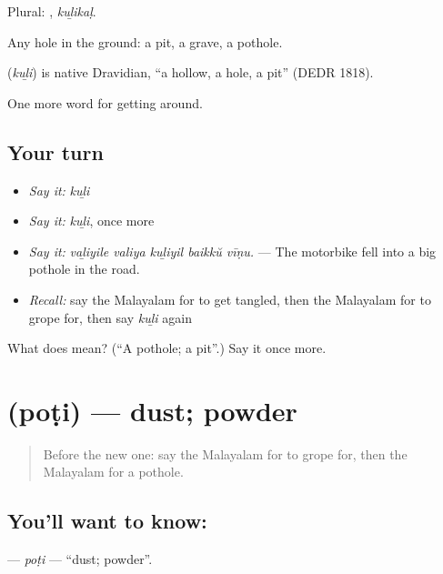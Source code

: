 Plural: , \emph{kuḻikaḷ}.

Any hole in the ground: a pit, a grave, a pothole.

\begin{cousinweb}
\textbf{} (\emph{kuḻi}) is native Dravidian, \textquotedblleft{}a hollow, a hole, a pit\textquotedblright{} (DEDR 1818).
\end{cousinweb}

\begin{grammarlens}[title={What you've built}]
One more word for getting around.
\end{grammarlens}

\subsection*{Your turn}
\begin{itemize}
\raggedright
  \item \emph{Say it:} \emph{kuḻi}
  \item \emph{Say it:} \emph{kuḻi}, once more
  \item \emph{Say it:} \emph{vaḻiyile valiya kuḻiyil baikkŭ vīṇu.} — The motorbike fell into a big pothole in the road.
  \item \emph{Recall:} say the Malayalam for to get tangled, then the Malayalam for to grope for, then say \emph{kuḻi} again
\end{itemize}

\begin{tcolorbox}[breakable,colback=teal!4,colframe=teal!35!black,title={Before you move on}]
What does  mean? (\textquotedblleft{}A pothole; a pit\textquotedblright{}.) Say it once more.
\end{tcolorbox}
\section[\texorpdfstring{\ml{പൊടി} (poṭi)}{പൊടി (poṭi)}]{ (poṭi) — dust; powder}

\label{lesson:ML-C516-poti}



\begin{quote}
Before the new one: say the Malayalam for to grope for, then the Malayalam for a pothole.
\end{quote}

\subsection*{You'll want to know: }
\textbf{} — \emph{poṭi} — \textquotedblleft{}dust; powder\textquotedblright{}.

